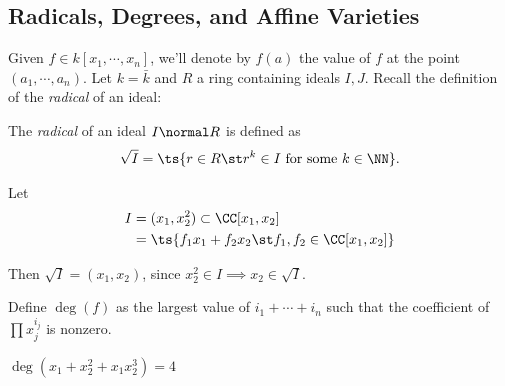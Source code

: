 \hypertarget{radicals-degrees-and-affine-varieties}{%
\subsection{Radicals, Degrees, and Affine
Varieties}\label{radicals-degrees-and-affine-varieties}}

Given \(f\in k[x_1, \cdots, x_n]\), we'll denote by \(f(a)\) the value
of \(f\) at the point \((a_1, \cdots, a_n)\). Let \(k = \bar k\) and
\(R\) a ring containing ideals \(I, J\). Recall the definition of the
\emph{radical} of an ideal:

\begin{definition}[Radical]

The \emph{radical} of an ideal \(I \normal R\) is defined as
\begin{align*}  
\sqrt{I} = \ts{r\in R \st r^k\in I \text{ for some } k\in \NN}
.\end{align*}

\end{definition}

\begin{example}

Let
\begin{align*}
I &= (x_1, x_2^2) \subset \CC[x_1, x_2] \\
  &= \ts{ f_1 x_1 + f_2 x_2 \st f_1, f_2 \in \CC[x_1, x_2]}
\end{align*}

Then \(\sqrt{I} = (x_1, x_2)\), since
\(x_2^2 \in I \implies x_2 \in \sqrt{I}\).

\end{example}

\begin{definition}

Define \(\deg(f)\) as the largest value of \(i_1 + \cdots + i_n\) such
that the coefficient of \(\prod x_j ^{i_j}\) is nonzero.

\end{definition}

\begin{example}

\(\deg(x_1 + x_2^2 + x_1 x_2^3) = 4\)

\end{example}

